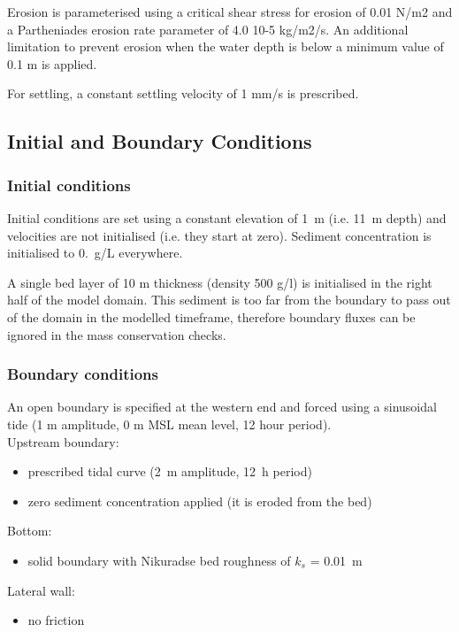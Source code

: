 Erosion is parameterised using a critical shear stress for erosion of 0.01 N/m2 
and a Partheniades erosion rate parameter of 4.0 10-5 kg/m2/s. An additional limitation 
to prevent erosion when the water depth is below a minimum value of 0.1 m is applied.

For settling, a constant settling velocity of 1 mm/s is prescribed. 

%
%
%
%
%
%
\subsection{Initial and Boundary Conditions}
%
\subsubsection{Initial conditions}
%
Initial conditions are set using a constant elevation of 1~m (i.e. 11~m
depth) and velocities are not initialised (i.e. they start at zero).
Sediment concentration is initialised to 0.~g/L everywhere.

A single bed layer of 10 m thickness (density 500 g/l) is initialised in the right half 
of the model domain. This sediment is too far from the boundary to pass out of the domain 
in the modelled timeframe, therefore boundary fluxes can be ignored in the mass conservation checks. 
%
\subsubsection{Boundary conditions}
%
An open boundary is specified at the western end and forced using a sinusoidal tide 
(1 m amplitude, 0 m MSL mean level, 12 hour period). 
\\
Upstream boundary:
\begin{itemize}
\item prescribed tidal curve  (2~m amplitude, 12~h period)
\item zero sediment concentration applied (it is eroded from the bed)
\end{itemize}
Bottom:
\begin{itemize}
\item
solid boundary with Nikuradse bed roughness of $k_s$ = 0.01~m
\end{itemize}
Lateral wall:
\begin{itemize}
\item no friction
\end{itemize}
%

